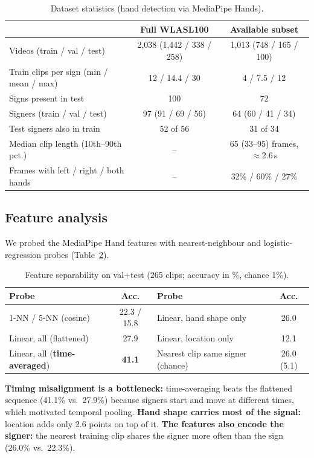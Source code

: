 \documentclass[10pt]{article}
\begin{document}
\begin{table}[h]
\centering\footnotesize
\begin{tabular}{lcc}
\toprule
 & Full WLASL100 & Available subset \\
\midrule
Videos (train / val / test) & 2{,}038 (1{,}442 / 338 / 258) & 1{,}013 (748 / 165 / 100) \\
Train clips per sign (min / mean / max) & 12 / 14.4 / 30 & 4 / 7.5 / 12 \\
Signs present in test & 100 & 72 \\
Signers (train / val / test) & 97 (91 / 69 / 56) & 64 (60 / 41 / 34) \\
Test signers also in train & 52 of 56 & 31 of 34 \\
Median clip length (10th--90th pct.) & -- & 65 (33--95) frames, $\approx$2.6\,s \\
Frames with left / right / both hands & -- & 32\% / 60\% / 27\% \\
\bottomrule
\end{tabular}
\caption{Dataset statistics (hand detection via MediaPipe Hands).}
\label{tab:data}
\end{table}

\subsection{Feature analysis}
We probed the MediaPipe Hand features with nearest-neighbour and logistic-regression probes (Table~\ref{tab:probe}).

\begin{table}[h]
\centering\footnotesize
\begin{tabular}{lc@{\hskip 1cm}lc}
\toprule
Probe & Acc. & Probe & Acc. \\
\midrule
1-NN / 5-NN (cosine) & 22.3 / 15.8 & Linear, hand shape only & 26.0 \\
Linear, all (flattened) & 27.9 & Linear, location only & 12.1 \\
Linear, all (\textbf{time-averaged}) & \textbf{41.1} & Nearest clip same signer (chance) & 26.0 (5.1) \\
\bottomrule
\end{tabular}
\caption{Feature separability on val+test (265 clips; accuracy in \%, chance 1\%). }
\label{tab:probe}
\end{table}

\textbf{Timing misalignment is a bottleneck:} time-averaging beats the flattened sequence (41.1\% vs.\ 27.9\%) because signers start and move at different times, which motivated temporal pooling. \textbf{Hand shape carries most of the signal:} location adds only 2.6 points on top of it. \textbf{The features also encode the signer:} the nearest training clip shares the signer more often than the sign (26.0\% vs.\ 22.3\%).
\end{document}
